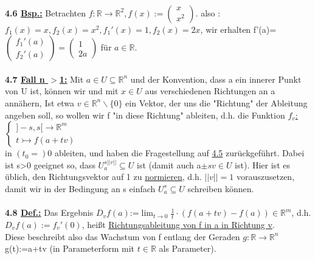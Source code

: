 \documentclass[]{scrartcl}
\begin{document}
	\\
	\textbf{4.6 \underline{Bsp.:}} Betrachten $f:\mathbb{R}\rightarrow\mathbb{R}^2, f(x):=\begin{pmatrix}
		x\\x^2
	\end{pmatrix}.$ also :$f_1(x)=x, f_2(x)=x^2, f_1'(x)=1, f_2(x)=2x$, wir erhalten f'(a)=$\begin{pmatrix}
		f_1'(a)\\f_2'(a)
	\end{pmatrix}=\begin{pmatrix}
	1\\2a
	\end{pmatrix}$ für $a\in \mathbb{R}$.\\
	\\
	\textbf{4.7 \underline{Fall n $>$1:}} Mit $a \in U\subseteq \mathbb{R}^n$ und der Konvention, dass a ein innerer Punkt von U ist, können wir und mit $x \in U$ aus verschiedenen Richtungen an a annähern, Ist etwa $v\in \mathbb{R}^n\backslash\{0\}$ ein Vektor, der uns die "Richtung" der Ableitung angeben soll, so wollen wir f "in diese Richtung" ableiten, d.h. die Funktion  \ul{$f_v$:}$\begin{cases}
		]-s,s[\rightarrow \mathbb{R}^m\\
		t\rightarrowtail f(a+tv)
	\end{cases}$\\ 
	in $(t_0=)0$ ableiten, und haben die Fragestellung auf \ul{4.5} zurückgeführt. Dabei ist s\textgreater0 geeignet so, dass $U_a^{s||v||}\subseteq U$ ist (damit auch a$\pm s v \in U$ ist). Hier ist es üblich, den Richtungsvektor auf 1 zu \underline{normieren}, d.h. $||v||=1$ vorauszusetzen, damit wir in der Bedingung an s einfach $U_a^s \subseteq U$ schreiben können.\\
	\\
	\textbf{4.8 \underline{Def.:}} Das Ergebnis \ul{$D_v f(a)$}:=$\lim_{t\rightarrow 0}\frac{1}{t}\cdot(f(a+tv)-f(a))\in\mathbb{R}^m$, d.h. \ul{$D_v f(a):=f_v'(0)$}, heißt \ul{Richtungsableitung von f in a in Richtung v}.\\
	Diese beschreibt also das Wachstum von f entlang der Geraden $g:\mathbb{R}\rightarrow \mathbb{R}^n$ \\
	g(t):=a+tv (in Parameterform mit $t \in \mathbb{R}$ als Parameter).\\
	\\
\end{document}
